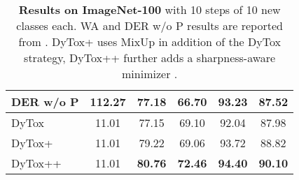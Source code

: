 \begin{table}[t]
\begin{tabular}{l|ccccc}
        DER w/o P \scriptsize{\citep{yan2021der}}                        & 112.27                          & 77.18                              & 66.70                              & 93.23        & 87.52         \\
        \hline
        DyTox                                                            & 11.01                           & 77.15                              & 69.10                              & 92.04        & 87.98         \\
        DyTox+                                                           & 11.01                           & 79.22                              & 69.06                              & 93.72        & 88.82         \\
        DyTox++                                                          & 11.01
                                                                         & \textbf{80.76}                  & \textbf{72.46}                     & \textbf{94.40}                     &
        \textbf{90.10}                                                                                                                                                                                              \\
        \hline
    \end{tabular}
    \caption{\textbf{Results on ImageNet-100} with 10 steps of 10 new classes each. WA and DER w/o P
        results are reported from \citet{yan2021der}. DyTox+ uses MixUp \citep{hingyi2018mixup} in
        addition of the DyTox strategy, DyTox++ further adds a sharpness-aware minimizer
        \citep{foret2020sam}.}
    \label{tab:dytox_imagenet_pp}
\end{table}
